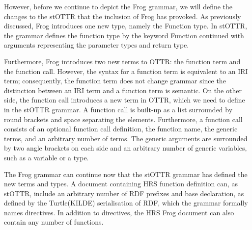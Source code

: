 \para



\para
However, before we continue to depict the Frog grammar, we will define the changes to the stOTTR that the inclusion of Frog has provoked. As previously discussed, Frog introduces one new type, namely the Function type. In stOTTR, the grammar defines the function type by the keyword Function continued with arguments representing the parameter types and return type.

\para


\para
Furthermore, Frog introduces two new terms to OTTR: the function term and the function call. However, the syntax for a function term is equivalent to an IRI term; consequently, the function term does not change grammar since the distinction between an IRI term and a function term is semantic. On the other side, the function call introduces a new term in OTTR, which we need to define in the stOTTR grammar. A function call is built-up as a list surrounded by round brackets \backgroundText{( )} and space separating the elements. Furthermore, a function call consists of an optional function call definition, the function name, the generic terms, and an arbitrary number of terms. The generic arguments are surrounded by two angle brackets on each side \backgroundText{<< >>} and an arbitrary number of generic variables, such as a variable or a type.

\para



\para
The Frog grammar can continue now that the stOTTR grammar has defined the new terms and types. A document containing HRS function definition can, as stOTTR, include an arbitrary number of RDF prefixes and base declaration, as defined by the Turtle(KILDE) serialisation of RDF, which the grammar formally names directives. In addition to directives, the HRS Frog document can also contain any number of functions.  

\para



